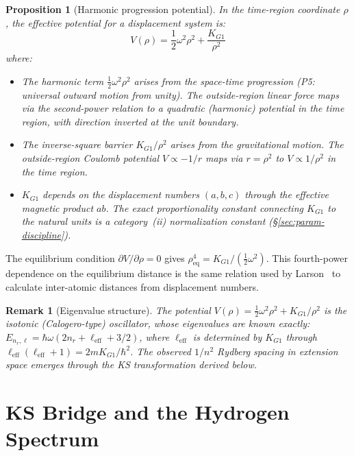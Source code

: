 \documentclass[11pt,a4paper]{article}
\newtheorem{proposition}[theorem]{Proposition}
\newtheorem{remark}[theorem]{Remark}
\begin{document}
\begin{proposition}[Harmonic progression potential]
\label{prop:tr-potential}
In the time-region coordinate $\rho$, the effective potential for a displacement system is:
\[
V(\rho) = \frac{1}{2}\omega^2 \rho^2 + \frac{K_{G1}}{\rho^2}
\]
where:
\begin{itemize}
\item The harmonic term $\tfrac{1}{2}\omega^2 \rho^2$ arises from the space-time progression (P5: universal outward motion from unity). The outside-region linear force maps via the second-power relation to a quadratic (harmonic) potential in the time region, with direction inverted at the unit boundary.
\item The inverse-square barrier $K_{G1}/\rho^2$ arises from the gravitational motion. The outside-region Coulomb potential $V \propto -1/r$ maps via $r = \rho^2$ to $V \propto 1/\rho^2$ in the time region.
\item $K_{G1}$ depends on the displacement numbers $(a, b, c)$ through the effective magnetic product $ab$. The exact proportionality constant connecting $K_{G1}$ to the natural units is a category~(ii) normalization constant (\S\ref{sec:param-discipline}).
\end{itemize}
\end{proposition}

The equilibrium condition $\partial V/\partial \rho = 0$ gives $\rho_{\mathrm{eq}}^4 = K_{G1}/(\tfrac{1}{2}\omega^2)$. This fourth-power dependence on the equilibrium distance is the same relation used by Larson~\cite{Larson1988} to calculate inter-atomic distances from displacement numbers.

\begin{remark}[Eigenvalue structure]
The potential $V(\rho) = \tfrac{1}{2}\omega^2\rho^2 + K_{G1}/\rho^2$ is the isotonic (Calogero-type) oscillator, whose eigenvalues are known exactly:
$E_{n_r, \ell} = \hbar\omega(2n_r + \ell_{\mathrm{eff}} + 3/2)$,
where $\ell_{\mathrm{eff}}$ is determined by $K_{G1}$ through $\ell_{\mathrm{eff}}(\ell_{\mathrm{eff}} + 1) = 2m K_{G1}/\hbar^2$. The observed $1/n^2$ Rydberg spacing in extension space emerges through the KS transformation derived below.
\end{remark}

\section{KS Bridge and the Hydrogen Spectrum}
\label{sec:ks}
\end{document}
